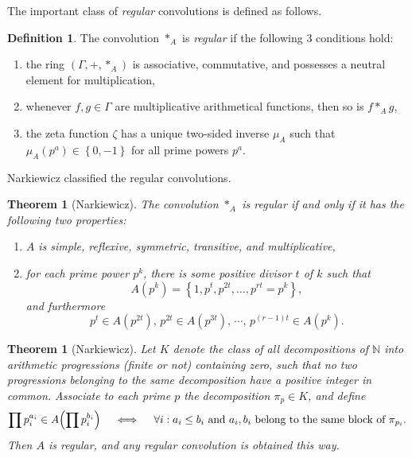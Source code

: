 \documentclass[12pt]{article}
\theoremstyle{definition}
\newtheorem{definition}{Definition}
\theoremstyle{remark}
\theoremstyle{plain}
\newtheorem{theorem}[lemma]{Theorem}
\newcommand{\set}[1]{\left\{{#1}\right\}}
\newcommand{\NN}{{\mathbb{N}}}
\begin{document}
The important class of \emph{regular} convolutions is defined as follows.
\begin{definition}
The convolution \(*_{A}\) is \emph{regular} if the following 3 conditions hold:
\begin{enumerate}[label={(\roman*)}]
\item the ring \((\Gamma,+,*_A)\) is associative, commutative, and possesses a neutral element for multiplication,
\item whenever \(f,g \in \Gamma\) are multiplicative arithmetical functions, then so is \(f *_{A} g\),
\item the zeta function \(\zeta\) has a unique two-sided inverse \(\mu_{A}\) such that
\(\mu_{A}(p^{a}) \in \set{0,-1}\) for all prime powers \(p^{a}\).
\end{enumerate}
\label{org5fb700c}
\end{definition}

Narkiewicz \cite{Nark:conv} classified the regular convolutions.
\begin{theorem}[Narkiewicz]
The convolution \(*_{A}\) is regular if and only if it has the following two properties:
\begin{enumerate}[label={(\roman*)}]
\item \(A\) is simple, reflexive, symmetric, transitive, and multiplicative,
\item for each prime power \(p^{k}\), there is some positive divisor \(t\) of \(k\)
such that
\begin{equation}
\label{eq:org559f6b8}
 A(p^{k}) = \set{1, p^{t}, p^{2t}, \dots, p^{rt}=p^{k}}, 
\end{equation}
and furthermore
\[
  p^{t} \in A(p^{2t}), \, p^{2t} \in A(p^{3t}), \,  \cdots , \,  p^{(r-1)t} \in A(p^{k}).
  \]
\end{enumerate}
\label{org0aec854}
\end{theorem}

\begin{theorem}[Narkiewicz]
Let \(K\) denote the class of all decompositions of \(\NN\) into
arithmetic progressions (finite or not) containing zero, such that no two progressions
belonging to the same decomposition have a positive integer in common. Associate to
each prime \(p\) the decomposition \(\pi_{p} \in K\), and define
\begin{equation}
\label{eq:org40e1f9c}
  \prod p_{i}^{a_{i}} \in A \Bigl( \prod p_{i}^{b_{i}} \Bigr) \quad \iff \quad \forall i: a_{i} \le b_{i}
  \text{ and } a_{i}, b_{i} \text { belong to the same block of } \pi_{p_{i}}.
\end{equation}
Then \(A\) is regular, and any regular convolution is obtained this way.
\label{org0791e1e}
\end{theorem}
\end{document}
